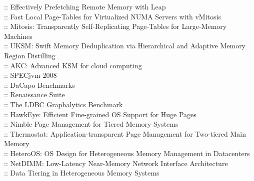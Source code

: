 \cite{leap.atc20} :: Effectively Prefetching Remote Memory with Leap \\
\cite{vmitosis.asplos21} :: Fast Local Page-Tables for Virtualized NUMA Servers with vMitosis \\
\cite{mitosis.asplos20} :: Mitosis: Transparently Self-Replicating Page-Tables for Large-Memory Machines \\
\cite{uksm.fast18} :: UKSM: Swift Memory Deduplication via Hierarchical and Adaptive Memory Region Distilling \\
\cite{akc.socc17} :: AKC: Advanced KSM for cloud computing \\
\cite{specjvm08.web} :: SPECjvm 2008 \\
\cite{dacapo.web} :: DaCapo Benchmarks \\
\cite{renaissance.web} :: Renaissance Suite \\
\cite{ldbcbench.web} :: The LDBC Graphalytics Benchmark \\
\cite{hawkeye.asplos19} :: HawkEye: Efficient Fine-grained OS Support for Huge Pages \\
\cite{nimblepage.asplos19} :: Nimble Page Management for Tiered Memory Systems \\
\cite{thermostat.asplos17} :: Thermostat: Application-transparent Page Management for Two-tiered Main Memory \\
\cite{heteroos.isca17} :: HeteroOS: OS Design for Heterogeneous Memory Management in Datacenters \\
\cite{netdimm.micro19} :: NetDIMM: Low-Latency Near-Memory Network Interface Architecture \\
\cite{datatiering.eurosys16} :: Data Tiering in Heterogeneous Memory Systems \\
